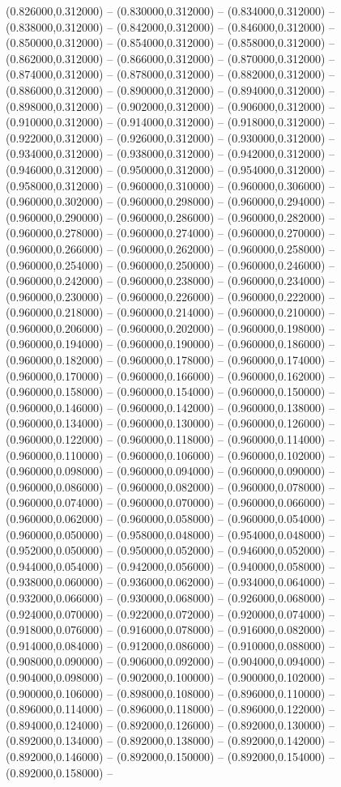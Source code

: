(0.826000,0.312000) -- (0.830000,0.312000) -- (0.834000,0.312000) -- (0.838000,0.312000) -- (0.842000,0.312000) -- (0.846000,0.312000) -- (0.850000,0.312000) -- (0.854000,0.312000) -- (0.858000,0.312000) -- (0.862000,0.312000) -- (0.866000,0.312000) -- (0.870000,0.312000) -- (0.874000,0.312000) -- (0.878000,0.312000) -- (0.882000,0.312000) -- (0.886000,0.312000) -- (0.890000,0.312000) -- (0.894000,0.312000) -- (0.898000,0.312000) -- (0.902000,0.312000) -- (0.906000,0.312000) -- (0.910000,0.312000) -- (0.914000,0.312000) -- (0.918000,0.312000) -- (0.922000,0.312000) -- (0.926000,0.312000) -- (0.930000,0.312000) -- (0.934000,0.312000) -- (0.938000,0.312000) -- (0.942000,0.312000) -- (0.946000,0.312000) -- (0.950000,0.312000) -- (0.954000,0.312000) -- (0.958000,0.312000) -- (0.960000,0.310000) -- (0.960000,0.306000) -- (0.960000,0.302000) -- (0.960000,0.298000) -- (0.960000,0.294000) -- (0.960000,0.290000) -- (0.960000,0.286000) -- (0.960000,0.282000) -- (0.960000,0.278000) -- (0.960000,0.274000) -- (0.960000,0.270000) -- (0.960000,0.266000) -- (0.960000,0.262000) -- (0.960000,0.258000) -- (0.960000,0.254000) -- (0.960000,0.250000) -- (0.960000,0.246000) -- (0.960000,0.242000) -- (0.960000,0.238000) -- (0.960000,0.234000) -- (0.960000,0.230000) -- (0.960000,0.226000) -- (0.960000,0.222000) -- (0.960000,0.218000) -- (0.960000,0.214000) -- (0.960000,0.210000) -- (0.960000,0.206000) -- (0.960000,0.202000) -- (0.960000,0.198000) -- (0.960000,0.194000) -- (0.960000,0.190000) -- (0.960000,0.186000) -- (0.960000,0.182000) -- (0.960000,0.178000) -- (0.960000,0.174000) -- (0.960000,0.170000) -- (0.960000,0.166000) -- (0.960000,0.162000) -- (0.960000,0.158000) -- (0.960000,0.154000) -- (0.960000,0.150000) -- (0.960000,0.146000) -- (0.960000,0.142000) -- (0.960000,0.138000) -- (0.960000,0.134000) -- (0.960000,0.130000) -- (0.960000,0.126000) -- (0.960000,0.122000) -- (0.960000,0.118000) -- (0.960000,0.114000) -- (0.960000,0.110000) -- (0.960000,0.106000) -- (0.960000,0.102000) -- (0.960000,0.098000) -- (0.960000,0.094000) -- (0.960000,0.090000) -- (0.960000,0.086000) -- (0.960000,0.082000) -- (0.960000,0.078000) -- (0.960000,0.074000) -- (0.960000,0.070000) -- (0.960000,0.066000) -- (0.960000,0.062000) -- (0.960000,0.058000) -- (0.960000,0.054000) -- (0.960000,0.050000) -- (0.958000,0.048000) -- (0.954000,0.048000) -- (0.952000,0.050000) -- (0.950000,0.052000) -- (0.946000,0.052000) -- (0.944000,0.054000) -- (0.942000,0.056000) -- (0.940000,0.058000) -- (0.938000,0.060000) -- (0.936000,0.062000) -- (0.934000,0.064000) -- (0.932000,0.066000) -- (0.930000,0.068000) -- (0.926000,0.068000) -- (0.924000,0.070000) -- (0.922000,0.072000) -- (0.920000,0.074000) -- (0.918000,0.076000) -- (0.916000,0.078000) -- (0.916000,0.082000) -- (0.914000,0.084000) -- (0.912000,0.086000) -- (0.910000,0.088000) -- (0.908000,0.090000) -- (0.906000,0.092000) -- (0.904000,0.094000) -- (0.904000,0.098000) -- (0.902000,0.100000) -- (0.900000,0.102000) -- (0.900000,0.106000) -- (0.898000,0.108000) -- (0.896000,0.110000) -- (0.896000,0.114000) -- (0.896000,0.118000) -- (0.896000,0.122000) -- (0.894000,0.124000) -- (0.892000,0.126000) -- (0.892000,0.130000) -- (0.892000,0.134000) -- (0.892000,0.138000) -- (0.892000,0.142000) -- (0.892000,0.146000) -- (0.892000,0.150000) -- (0.892000,0.154000) -- (0.892000,0.158000) -- 